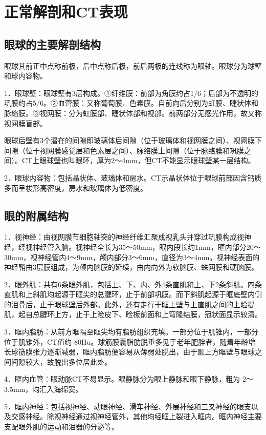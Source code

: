 \section{正常解剖和CT表现}

\subsection{眼球的主要解剖结构}

眼球其前正中点称前极，后中点称后极，前后两极的连线称为眼轴。眼球分为球壁和球内容物。

1．眼球壁：眼球壁有3层构成。①纤维膜：前部为角膜约占1/6；后部为不透明的巩膜约占5/6。②血管膜：又称葡萄膜、色素膜。自前向后分别为虹膜、睫状体和脉络膜。③视网膜：分为虹膜部、睫状体部和视部。前两部分无感光作用，故又称视网膜盲部。

眼球后壁有3个潜在的间隙即玻璃体后间隙（位于玻璃体和视网膜之间）、视网膜下间隙（位于视网膜感觉层和色素层之间）、脉络膜上间隙（位于脉络膜和巩膜之间）。CT上眼球壁也叫眼环，厚为2～4mm，但CT不能显示眼球壁某一层结构。

2．眼球内容物：包括晶状体、玻璃体和房水。CT示晶状体位于眼球前部因含钙质多而呈梭形高密度，房水和玻璃体为低密度。

\subsection{眼的附属结构}

1．视神经：由视网膜节细胞轴突的神经纤维汇聚成视乳头并穿过巩膜构成视神经，经视神经管入脑。视神经全长为35～50mm，眼内段长约1mm，眶内部分20～30mm，视神经管内4～9mm，颅内部分3～6mm，直径为3～4mm。视神经表面的神经鞘由3层膜组成，为颅内脑膜的延续，由内向外为软脑膜、蛛网膜和硬脑膜。

2．眼外肌：共有6条眼外肌，包括上、下、内、外4条直肌和上、下2条斜肌。四条直肌和上斜肌均起源于眶尖的总腱环，止于前部巩膜。而下斜肌起源于眶底壁内侧的泪骨后，止于眼球壁后外部。此外，还有走行于眶上壁与上直肌之间的上睑提肌，起自总腱环上方，止于上睑皮下、睑板前面和上穹隆结膜，冠状面显示较清。

3．眶内脂肪：从前方眶隔至眶尖均有脂肪组织充填。一部分位于肌锥内，一部分位于肌锥外，CT值约-80Hu。球筋膜囊脂肪脱垂多见于老年肥胖者，随着年龄增长球筋膜张力逐渐减弱，眶内脂肪便容易从薄弱处脱出，由于颞上方眶壁与眼球之间间隙较大，故脱出多位居此处。　

4．眶内血管：眼动脉CT不易显示。眼静脉分为眼上静脉和眼下静脉，粗为
2～3.5mm，均汇入海绵窦。

5．眶内神经：包括视神经、动眼神经、滑车神经、外展神经和三叉神经的眼支以及交感神经。除视神经通过视神经管外，其他均经眶上裂进入眶内。眶内神经主要支配眼外肌的运动和泪器的分泌等。

